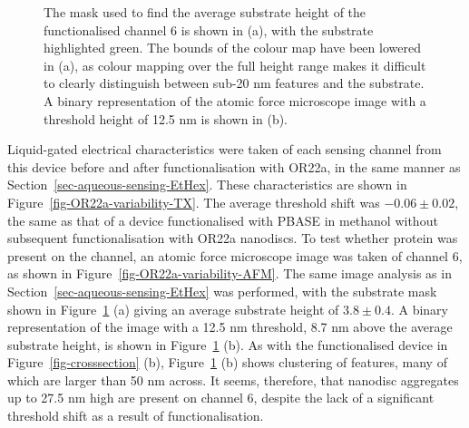 \documentclass[
  a4paper,
]{scrbook}
\begin{document}
\begin{figure}
\begin{minipage}[t]{0.01\linewidth}
{}

\end{minipage}%

\caption{\label{fig-OR22a-variability-AFM-comparison}The mask used to
find the average substrate height of the functionalised channel 6 is
shown in (a), with the substrate highlighted green. The bounds of the
colour map have been lowered in (a), as colour mapping over the full
height range makes it difficult to clearly distinguish between sub-20 nm
features and the substrate. A binary representation of the atomic force
microscope image with a threshold height of 12.5 nm is shown in (b).}

\end{figure}

Liquid-gated electrical characteristics were taken of each sensing
channel from this device before and after functionalisation with OR22a,
in the same manner as Section~\ref{sec-aqueous-sensing-EtHex}. These
characteristics are shown in Figure~\ref{fig-OR22a-variability-TX}. The
average threshold shift was \(-0.06\pm0.02\), the same as that of a
device functionalised with PBASE in methanol without subsequent
functionalisation with OR22a nanodiscs. To test whether protein was
present on the channel, an atomic force microscope image was taken of
channel 6, as shown in Figure~\ref{fig-OR22a-variability-AFM}. The same
image analysis as in Section~\ref{sec-aqueous-sensing-EtHex} was
performed, with the substrate mask shown in
Figure~\ref{fig-OR22a-variability-AFM-comparison} (a) giving an average
substrate height of \(3.8\pm0.4\). A binary representation of the image
with a 12.5 nm threshold, 8.7 nm above the average substrate height, is
shown in Figure~\ref{fig-OR22a-variability-AFM-comparison} (b). As with
the functionalised device in Figure~\ref{fig-crosssection} (b),
Figure~\ref{fig-OR22a-variability-AFM-comparison} (b) shows clustering
of features, many of which are larger than 50 nm across. It seems,
therefore, that nanodisc aggregates up to 27.5 nm high are present on
channel 6, despite the lack of a significant threshold shift as a result
of functionalisation.
\end{document}
